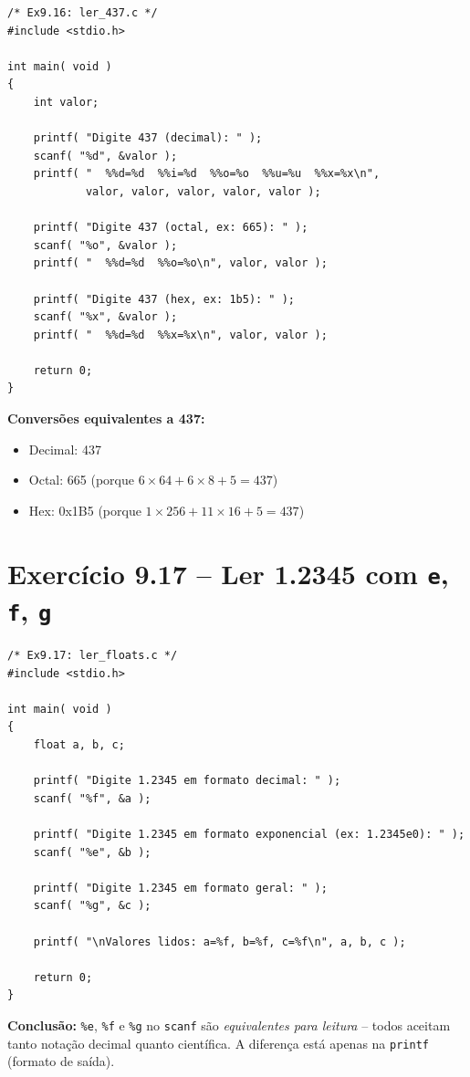 \documentclass[12pt,a4paper]{article}
\begin{document}
\begin{respostabox}
\begin{lstlisting}
/* Ex9.16: ler_437.c */
#include <stdio.h>

int main( void )
{
    int valor;

    printf( "Digite 437 (decimal): " );
    scanf( "%d", &valor );
    printf( "  %%d=%d  %%i=%d  %%o=%o  %%u=%u  %%x=%x\n",
            valor, valor, valor, valor, valor );

    printf( "Digite 437 (octal, ex: 665): " );
    scanf( "%o", &valor );
    printf( "  %%d=%d  %%o=%o\n", valor, valor );

    printf( "Digite 437 (hex, ex: 1b5): " );
    scanf( "%x", &valor );
    printf( "  %%d=%d  %%x=%x\n", valor, valor );

    return 0;
}
\end{lstlisting}

\textbf{Conversões equivalentes a 437:}
\begin{itemize}[noitemsep]
  \item Decimal: 437
  \item Octal: 665 (porque $6 \times 64 + 6 \times 8 + 5 = 437$)
  \item Hex: 0x1B5 (porque $1 \times 256 + 11 \times 16 + 5 = 437$)
\end{itemize}
\end{respostabox}

\section{Exercício 9.17 -- Ler 1.2345 com \texttt{e}, \texttt{f}, \texttt{g}}

\begin{respostabox}
\begin{lstlisting}
/* Ex9.17: ler_floats.c */
#include <stdio.h>

int main( void )
{
    float a, b, c;

    printf( "Digite 1.2345 em formato decimal: " );
    scanf( "%f", &a );

    printf( "Digite 1.2345 em formato exponencial (ex: 1.2345e0): " );
    scanf( "%e", &b );

    printf( "Digite 1.2345 em formato geral: " );
    scanf( "%g", &c );

    printf( "\nValores lidos: a=%f, b=%f, c=%f\n", a, b, c );

    return 0;
}
\end{lstlisting}

\textbf{Conclusão:} \texttt{\%e}, \texttt{\%f} e \texttt{\%g} no \texttt{scanf} são
\textit{equivalentes para leitura} -- todos aceitam tanto notação decimal quanto
científica. A diferença está apenas na \texttt{printf} (formato de saída).
\end{respostabox}
\end{document}
